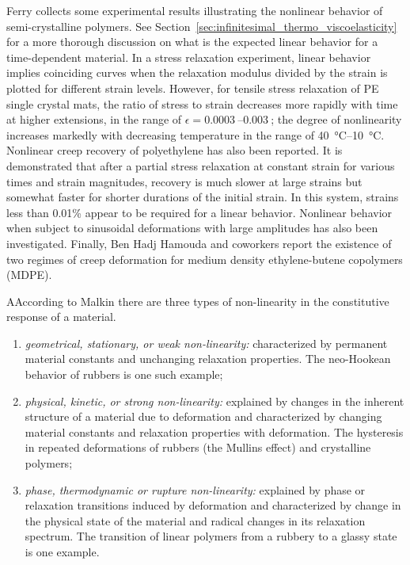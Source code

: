 Ferry \citep{ferryViscoelasticPropertiesPolymers1980} collects some experimental results illustrating the nonlinear behavior of semi-crystalline polymers.
See Section~\ref{sec:infinitesimal_thermo_viscoelasticity} for a more thorough discussion on what is the expected linear behavior for a time-dependent material.
In a stress relaxation experiment, linear behavior implies coinciding curves when the relaxation modulus divided by the strain is plotted for different strain levels.
However, for tensile stress relaxation of PE single crystal mats, the ratio of stress to strain decreases more rapidly with time at higher extensions, in the range of $\epsilon = \SIrange{0.0003}{0.003}{}$; the degree of nonlinearity increases markedly with decreasing temperature in the range of \SIrange{40}{10}{\celsius}.
Nonlinear creep recovery of polyethylene has also been reported.
It is demonstrated that after a partial stress relaxation at constant strain for various times and strain magnitudes, recovery is much slower at large strains but somewhat faster for shorter durations of the initial strain.
In this system, strains less than 0.01\% appear to be required for a linear behavior.
Nonlinear behavior when subject to sinusoidal deformations with large amplitudes has also been investigated.
Finally, Ben Hadj Hamouda and coworkers \citep{benhadjhamoudaViscoplasticBehaviourMedium2007} report the existence of two regimes of creep deformation for medium density ethylene-butene copolymers (MDPE).

\begin{remark}
    AAccording to Malkin \citep{malkinNonlinearityRheologyEssay1995} there are three types of non-linearity in the constitutive response of a material.
    \begin{enumerate}
        \item \textit{geometrical, stationary, or weak non-linearity:} characterized by permanent material constants and unchanging relaxation properties. The neo-Hookean behavior of rubbers is one such example;
        \item \textit{physical, kinetic, or strong non-linearity:} explained by changes in the inherent structure of a material due to deformation and characterized by changing material constants and relaxation properties with deformation. The hysteresis in repeated deformations of rubbers (the Mullins effect) and crystalline polymers;
        \item \textit{phase, thermodynamic or rupture non-linearity:} explained by phase or relaxation transitions induced by deformation and characterized by change in the physical state of the material and radical changes in its relaxation spectrum. The transition of linear polymers from a rubbery to a glassy state is one example.
    \end{enumerate}
\end{remark}

